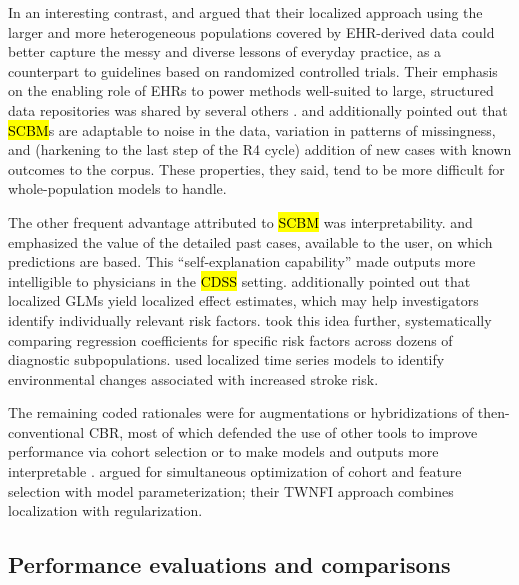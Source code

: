 \documentclass[sn-mathphys,Numbered,pdflatex]{sn-jnl}
\theoremstyle{remark}
\theoremstyle{definition}
\begin{document}
In an interesting contrast, \citet{Tang2021} and \citet{Ng2021} argued
that their localized approach using the larger and more heterogeneous
populations covered by EHR-derived data could better capture the messy
and diverse lessons of everyday practice, as a counterpart to guidelines
based on randomized controlled trials. Their emphasis on the enabling
role of EHRs to power methods well-suited to large, structured data
repositories was shared by several others
\citep{CampilloGimenez2013, Nicolas2014, Verma2015, Lee2017}.
\citet{Verma2015} and \citet{Zhang2018} additionally pointed out that
\hl{SCBM}s are adaptable to noise in the data, variation in patterns of
missingness, and (harkening to the last step of the R4 cycle) addition
of new cases with known outcomes to the corpus. These properties, they
said, tend to be more difficult for whole-population models to handle.

The other frequent advantage attributed to \hl{SCBM} was
interpretability. \citet{Elter2007} and \citet{Nicolas2014} emphasized
the value of the detailed past cases, available to the user, on which
predictions are based. This ``self-explanation capability'' made outputs
more intelligible to physicians in the \hl{CDSS} setting. \citet{Ng2015}
additionally pointed out that localized GLMs yield localized effect
estimates, which may help investigators identify individually relevant
risk factors. \citet{Liu2022} took this idea further, systematically
comparing regression coefficients for specific risk factors across
dozens of diagnostic subpopulations. \citet{Doborjeh2022} used localized
time series models to identify environmental changes associated with
increased stroke risk.

The remaining coded rationales were for augmentations or hybridizations
of then-conventional CBR, most of which defended the use of other tools
to improve performance via cohort selection
\citep{CampilloGimenez2013, Nicolas2014, Vilhena2016} or to make models
and outputs more interpretable \citep{Lopez2011, Wang2019}.
\citet{Liang2015} argued for simultaneous optimization of cohort and
feature selection with model parameterization; their TWNFI approach
combines localization with regularization.

\subsection*{Performance evaluations and
comparisons}\label{performance-evaluations-and-comparisons}
\end{document}
